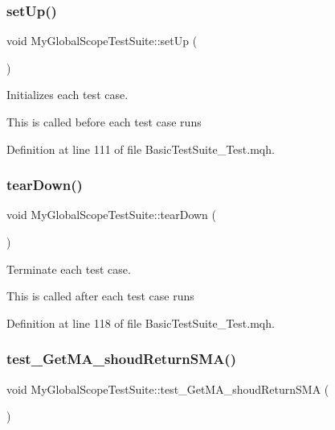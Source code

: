 \subsubsection{\texorpdfstring{set\+Up()}{setUp()}}
{\footnotesize\ttfamily void My\+Global\+Scope\+Test\+Suite\+::set\+Up (\begin{DoxyParamCaption}{ }\end{DoxyParamCaption})\hspace{0.3cm}{\ttfamily [inline]}}



Initializes each test case. 

This is called before each test case runs 

Definition at line 111 of file Basic\+Test\+Suite\+\_\+\+Test.\+mqh.

\mbox{\label{class_my_global_scope_test_suite_aa99b3ed200fc5ff645509972190a4b29}} 
\subsubsection{\texorpdfstring{tear\+Down()}{tearDown()}}
{\footnotesize\ttfamily void My\+Global\+Scope\+Test\+Suite\+::tear\+Down (\begin{DoxyParamCaption}{ }\end{DoxyParamCaption})\hspace{0.3cm}{\ttfamily [inline]}}



Terminate each test case. 

This is called after each test case runs 

Definition at line 118 of file Basic\+Test\+Suite\+\_\+\+Test.\+mqh.

\mbox{\label{class_my_global_scope_test_suite_a312549090f668135e117a8d6bb1160c0}} 
\subsubsection{\texorpdfstring{test\+\_\+\+Get\+M\+A\+\_\+shoud\+Return\+S\+M\+A()}{test\_GetMA\_shoudReturnSMA()}}
{\footnotesize\ttfamily void My\+Global\+Scope\+Test\+Suite\+::test\+\_\+\+Get\+M\+A\+\_\+shoud\+Return\+S\+MA (\begin{DoxyParamCaption}{ }\end{DoxyParamCaption})\hspace{0.3cm}{\ttfamily [inline]}}



